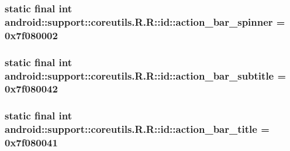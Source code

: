 \hypertarget{classandroid_1_1support_1_1coreutils_1_1_r_1_1id_60a65bf2ae5af3a6606534a326b6e6b5}{
\subsubsection[{action\_\-bar\_\-spinner}]{\setlength{\rightskip}{0pt plus 5cm}static final int android::support::coreutils.R.R::id::action\_\-bar\_\-spinner = 0x7f080002}}
\label{classandroid_1_1support_1_1coreutils_1_1_r_1_1id_60a65bf2ae5af3a6606534a326b6e6b5}


\hypertarget{classandroid_1_1support_1_1coreutils_1_1_r_1_1id_a6c22aa47786dd279fb456f3da99f439}{
\subsubsection[{action\_\-bar\_\-subtitle}]{\setlength{\rightskip}{0pt plus 5cm}static final int android::support::coreutils.R.R::id::action\_\-bar\_\-subtitle = 0x7f080042}}
\label{classandroid_1_1support_1_1coreutils_1_1_r_1_1id_a6c22aa47786dd279fb456f3da99f439}


\hypertarget{classandroid_1_1support_1_1coreutils_1_1_r_1_1id_a3b3954ed6c0d48f73a891bf449455f9}{
\subsubsection[{action\_\-bar\_\-title}]{\setlength{\rightskip}{0pt plus 5cm}static final int android::support::coreutils.R.R::id::action\_\-bar\_\-title = 0x7f080041}}
\label{classandroid_1_1support_1_1coreutils_1_1_r_1_1id_a3b3954ed6c0d48f73a891bf449455f9}


